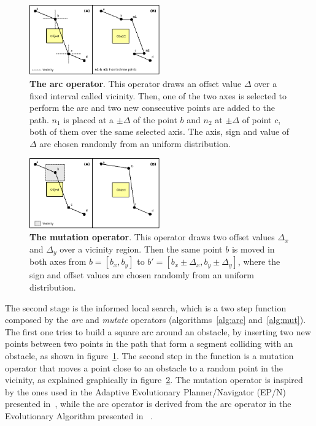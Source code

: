 \begin{figure}[ht]
\begin{center}
\includegraphics[width=0.5\textwidth]{images/arc}
\caption[The arc operator]{\textbf{The arc operator}. This operator draws an offset value $\Delta$ over a fixed interval called vicinity.
Then, one of the two axes is selected to perform the arc and two new consecutive points are added to the path.
$n_1$ is placed at a $\pm \Delta$ of the point $b$ and $n_2$ at $\pm \Delta$ of point $c$, both of them over the same selected axis.
The axis, sign and value of $\Delta$ are chosen randomly from an uniform distribution.}
\label{fig:arc}
\end{center}
\end{figure}

\begin{figure}[ht]
\begin{center}
\includegraphics[width=0.5\textwidth]{images/mut}
\caption[The mutation operator]{\textbf{The mutation operator}. This operator draws two offset values $\Delta_x$ and $\Delta_y$ over a vicinity
region. Then the same point $b$ is moved in both axes from $b=[b_x,b_y]$ to $b'=[b_x \pm \Delta_x, b_y\pm \Delta_y]$, where the sign and offset values
are chosen randomly from an uniform distribution.}
\label{fig:mut}
\end{center}
\end{figure}

The second stage is the informed local search,
which is a two step function composed by the \emph{arc} and \emph{mutate} operators
(algorithms~\ref{alg:arc} and~\ref{alg:mut}).
The first one tries to build a square arc around an
obstacle, by inserting two new points between two points in the path that form a
segment colliding with an obstacle, as shown in figure~\ref{fig:arc}.
The second step in the function is a mutation
operator that moves a point close to an obstacle to a
random point in the vicinity, as explained graphically in figure~\ref{fig:mut}.
The mutation operator is inspired by the ones used in the Adaptive Evolutionary
Planner/Navigator (EP/N) presented in~\cite{Xiao97}, while the arc operator is
derived from the arc operator in the Evolutionary Algorithm presented in~%
\cite{Alfaro05}.


